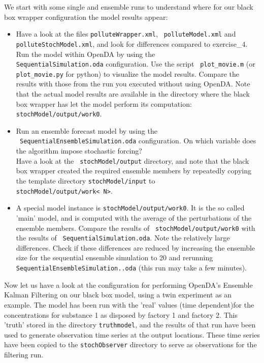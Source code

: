 \documentclass[a4paper,10pt]{article}
\begin{document}
We start with some single and ensemble runs to understand where for our black
box wrapper configuration the model results appear:
\begin{itemize}

 \item Have a look at the files {\tt polluteWrapper.xml}, {\tt
   polluteModel.xml} and {\tt polluteStochModel.xml}, and look for differences compared to exercise\_4.
   Run the model within OpenDA by using
   the \\{\tt SequentialSimulation.oda} configuration. Use the script {\tt
   plot\_movie.m} (or {\tt plot\_movie.py} for python) to visualize the model 
   results. Compare the results with
   those from the run you executed without using OpenDA. Note that the actual
   model results are available in the directory where the black box wrapper has
   let the model perform its computation: {\tt stochModel/output/work0}.
 \item Run an ensemble forecast model by using the \\{\tt
   SequentialEnsembleSimulation.oda} configuration. On which variable does the
   algorithm impose stochastic forcing?\\ Have a look at the {\tt
     stochModel/output} directory, and note that the black box wrapper created
   the required ensemble members by repeatedly copying the template directory
   {\tt stochModel/input} to\\ {\tt stochModel/output/work\textless
     N\textgreater}.
 \item A special model instance is {\tt stochModel/output/work0}. It is the so
   called 'main' model, and is computed with the average of the perturbations
   of the ensemble members. Compare the results of {\tt
     stochModel/output/work0} with the results of {\tt
     SequentialSimulation.oda}. Note the relatively large differences. Check if
   these differences are reduced by increasing the ensemble size for the
   sequential ensemble simulation to 20 and rerunning {\tt
     SequentialEnsembleSimulation..oda} (this run may take a few minutes).
\end{itemize}

Now let us have a look at the configuration for performing OpenDA's Ensemble
Kalman Filtering on our black box model, using a twin experiment as an example.
The model has been run with the 'real' values (time dependent)for the
concentrations for substance 1 as disposed by factory 1 and factory 2. This
'truth' stored in the directory {\tt truthmodel}, and the results of that run
have been used to generate observation time series at the output locations.
These time series have been copied to the {\tt stochObserver} directory to
serve as observations for the filtering run.
\end{document}

